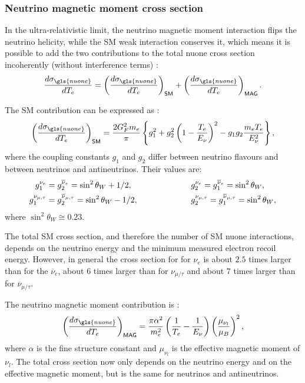\subsubsection{Neutrino magnetic moment cross section}
In the ultra-relativistic limit, the neutrino magnetic moment interaction flips the neutrino helicity, while the \gls{SM} weak interaction conserves it, which means it is possible to add the two contributions to the total \gls{nuone} cross section incoherently (without interference terms) \cite{nuElmagInt2015.pdf}:
\begin{equation}
\frac{d\sigma_{\gls{nuone}}}{dT_e}=\left(\frac{d\sigma_{\gls{nuone}}}{dT_e}\right)_{\textsf{SM}}+\left(\frac{d\sigma_{\gls{nuone}}}{dT_e}\right)_{\textsf{MAG}}.
\end{equation}

The \gls{SM} contribution can be expressed as \cite{FundamentalsOfNeutrinoPhysics.pdf, nuElmagInt2015.pdf}:
\begin{equation}\label{eq:NuMMSMCrossSection}
\left(\frac{d\sigma_{\gls{nuone}}}{dT_e}\right)_{\textsf{SM}}=\frac{2G_F^2m_e}{\pi}\left\lbrace g_1^2+g_2^2\left(1-\frac{T_e}{E_{\nu}}\right)^2-g_1 g_2\frac{m_eT_e}{E_{\nu}^2}\right\rbrace,
\end{equation}
where the coupling constants $g_1$ and $g_2$ differ between neutrino flavours and between neutrinos and antineutrinos. Their values are:
\begin{align}
g_1^{\nu_e}&=g_2^{\overline{\nu}_e}=\sin^2\theta_W+1/2,\hspace{2.5cm} g_2^{\nu_e}=g_1^{\overline{\nu}_e}=\sin^2\theta_W,\\
g_1^{\nu_{\mu,\tau}}&=g_2^{\overline{\nu}_{\mu,\tau}}=\sin^2\theta_W-1/2,\hspace{2.25cm} g_2^{\nu_{\mu,\tau}}=g_1^{\overline{\nu}_{\mu,\tau}}=\sin^2\theta_W,
\end{align}
where $\sin^2\theta_W\cong 0.23$.

The total \gls{SM} cross section, and therefore the number of \gls{SM} \gls{nuone} interactions, depends on the neutrino energy and the minimum measured electron recoil energy. However, in general the cross section for for $\nu_e$ is about $2.5$ times larger than for the $\overline{\nu}_e$, about $6$ times larger than for $\nu_{\mu/\tau}$ and about $7$ times larger than for $\overline{\nu}_{\mu/\tau}$.

The neutrino magnetic moment contribution is \cite{NeutrinoElmagFormFactors1989.pdf, nuElmagInt2015.pdf}:
\begin{equation}\label{eq:NuMMMMCrossSection}
\left(\frac{d\sigma_{\gls{nuone}}}{dT_e}\right)_{\textsf{MAG}}=\frac{\pi\alpha^2}{m_e^2}\left(\frac{1}{T_e}-\frac{1}{E_{\nu}}\right)\left(\frac{\mu_{\nu_l}}{\mu_B}\right)^2,
\end{equation}
where $\alpha$ is the fine structure constant and $\mu_{\nu_l}$ is the effective magnetic moment of $\nu_l$. The total cross section now only depends on the neutrino energy and on the effective magnetic moment, but is the same for neutrinos and antineutrinos.


